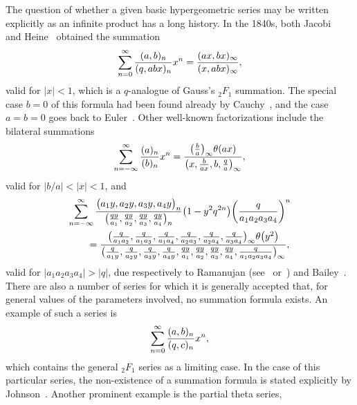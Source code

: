\documentclass[pdftex]{sigma}
\numberwithin{equation}{section}
\begin{document}
The question of whether a given basic hypergeometric series may be written explicitly as an infinite product has a long history. In the 1840s, both Jacobi~\cite[equation~(15)]{Jacobi1846} and Heine~\cite[equation~(80)]{Heine1847} obtained the summation
\begin{equation} \label{eqn:q-Gauss}
\sum_{n=0}^\infty {(a,b)_n \over (q,abx)_n} x^n = {(ax,bx)_\infty \over (x,abx)_\infty},
\end{equation}
valid for $|x|<1$, which is a $q$-analogue of Gauss's $_2F_1$ summation. The special case ${b=0}$ of this formula had been found already by Cauchy~\cite[Section~I, equation~(15)]{Cauchy1843}, and the case~${a=b=0}$ goes back to Euler~\cite[Section~25]{Euler1753}. Other well-known factorizations include the bilateral summations
\begin{equation} \label{eqn:1psi1}
\sum_{n=-\infty}^\infty {(a)_n \over (b)_n} x^n = {\bigl({b \over a}\bigr)_\infty \theta(ax) \over \bigl(x,{b \over ax},b,{q \over a}\bigr)_\infty},
\end{equation}
valid for $|b/a|<|x|<1$, and
\begin{gather}
\sum_{n=-\infty}^\infty {\bigl(a_1y,a_2y,a_3y,a_4y\bigr)_n \over \bigl({qy \over a_1}, {qy \over a_2}, {qy \over a_3}, {qy \over a_4}\bigr)_n} \bigl( 1 - y^2q^{2n} \bigr) \bigg( {q \over a_1a_2a_3a_4} \bigg)^{ n}\nonumber \\
\qquad = {\bigl({q \over a_1a_2}, {q \over a_1a_3}, {q \over a_1a_4}, {q \over a_2a_3}, {q \over a_2a_4}, {q \over a_3a_4}\bigr)_\infty \theta\bigl(y^2\bigr) \over \bigl({q \over a_1y}, {q \over a_2y}, {q \over a_3y}, {q \over a_4y}, {qy \over a_1}, {qy \over a_2}, {qy \over a_3}, {qy \over a_4}, {q \over a_1a_2a_3a_4}\bigr)_\infty},\label{eqn:6psi6}
\end{gather}
valid for $|a_1a_2a_3a_4|>|q|$, due respectively to Ramanujan (see~\cite[Sections~3.2 and~3.3]{Andrews2009} or~\cite[pp.~222--223]{Hardy1940}) and Bailey~\cite[equation~(4.7)]{Bailey1936}. There are also a number of series for which it is generally accepted that, for general values of the parameters involved, no summation formula exists. An example of such a series is
\begin{equation} \label{eqn:2phi1_series}
\sum_{n=0}^\infty {(a,b)_n \over (q,c)_n} x^n,
\end{equation}
which contains the general $_2F_1$ series as a limiting case. In the case of this particular series, the non-existence of a summation formula is stated explicitly by Johnson~\cite[p.~227]{Johnson2020}. Another prominent example is the partial theta series,
\end{document}
